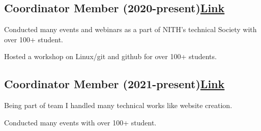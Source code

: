 \documentclass[a4paper,12pt]{article}
\begin{document}


\vspace*{4pt}
\subsection{{Coordinator Member (2020-present)}\hfill \href{https://www.istenith.com/}{\textbf{Link}}} %
\begin{zitemize}
\item Conducted many events and webinars as a part of NITH’s technical Society with over 100+ student.
\item Hosted a workshop on Linux/git and github for over 100+ students.
\end{zitemize}

\vspace*{4pt}
\subsection{{Coordinator Member (2021-present)}\hfill \href{https://chelix.festnimbus.com/}{\textbf{Link}}} %
\begin{zitemize}
\item Being part of team I handled many technical works like website creation.
\item Conducted many events with over 100+ student.
\end{zitemize}
\end{document}
